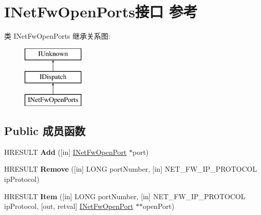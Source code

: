 \hypertarget{interface_i_net_fw_open_ports}{}\section{I\+Net\+Fw\+Open\+Ports接口 参考}
\label{interface_i_net_fw_open_ports}
类 I\+Net\+Fw\+Open\+Ports 继承关系图\+:\begin{figure}[H]
\begin{center}
\leavevmode
\includegraphics[height=3.000000cm]{interface_i_net_fw_open_ports}
\end{center}
\end{figure}
\subsection*{Public 成员函数}
\begin{DoxyCompactItemize}
\item 
\mbox{\label{interface_i_net_fw_open_ports_af19429c4d0161ca64931b32e77b72f36}} 
H\+R\+E\+S\+U\+LT {\bfseries Add} (\mbox{[}in\mbox{]} \hyperlink{interface_i_net_fw_open_port}{I\+Net\+Fw\+Open\+Port} $\ast$port)
\item 
\mbox{\label{interface_i_net_fw_open_ports_a008b18ec67d4a4d84aa6c55687f1a475}} 
H\+R\+E\+S\+U\+LT {\bfseries Remove} (\mbox{[}in\mbox{]} L\+O\+NG port\+Number, \mbox{[}in\mbox{]} N\+E\+T\+\_\+\+F\+W\+\_\+\+I\+P\+\_\+\+P\+R\+O\+T\+O\+C\+OL ip\+Protocol)
\item 
\mbox{\label{interface_i_net_fw_open_ports_a54b26916733b24f0ef73dffb8e6c062b}} 
H\+R\+E\+S\+U\+LT {\bfseries Item} (\mbox{[}in\mbox{]} L\+O\+NG port\+Number, \mbox{[}in\mbox{]} N\+E\+T\+\_\+\+F\+W\+\_\+\+I\+P\+\_\+\+P\+R\+O\+T\+O\+C\+OL ip\+Protocol, \mbox{[}out, retval\mbox{]} \hyperlink{interface_i_net_fw_open_port}{I\+Net\+Fw\+Open\+Port} $\ast$$\ast$open\+Port)
\end{DoxyCompactItemize}
